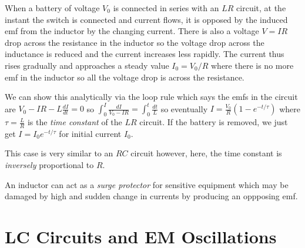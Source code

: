 \begin{remark}
    When a battery of voltage $V_0$ is connected in series with an $LR$ circuit, at the instant the switch is connected and current flows, it is opposed by the induced emf from the inductor by the changing current. There is also a voltage $V = IR$ drop across the resistance in the inductor so the voltage drop across the inductance is reduced and the current increases less rapidly. The current thus rises gradually and approaches a steady value $I_0 = V_0/R$ where there is no more emf in the inductor so all the voltage drop is across the resistance.

    We can show this analytically via the loop rule which says the emfs in the circuit are $V_0 - IR - L\frac{dI}{dt} = 0$ so $\int_{0}^I\frac{dI}{V_0-IR} = \int_0^t\frac{dt}{L}$ so eventually $I = \frac{V_0}{R}(1-e^{-t/\tau})$ where $\tau = \frac{L}{R}$ is the \emph{time constant} of the $LR$ circuit. If the battery is removed, we just get $I = I_0e^{-t/\tau}$ for initial current $I_0$.

    This case is very similar to an $RC$ circuit however, here, the time constant is \emph{inversely} proportional to $R$.
\end{remark}
\begin{definition}
    An inductor can act as a \emph{surge protector} for sensitive equipment which may be damaged by high and sudden change in currents by producing an oppposing emf.
\end{definition}

\section{LC Circuits and EM Oscillations}

